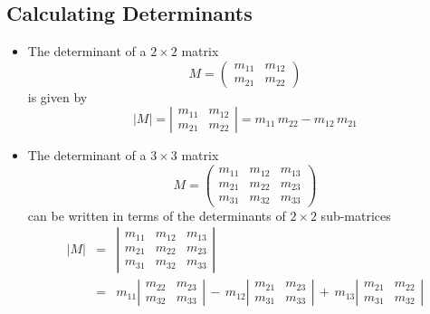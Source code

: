 \documentclass[12pt]{article}
\begin{document}
\begin{latexonly}
\subsection*{Calculating Determinants}
\end{latexonly}

\begin{itemize}
\item The determinant of a $2 \times 2$ matrix
\begin{equation}
M = 
\left(
\begin{array}{cccc}
m_{11}  & m_{12} \\
m_{21}  & m_{22} 
\end{array}
\right)
\end{equation}
is given by
\begin{equation}
|M| = 
\left|
\begin{array}{cccc}
m_{11}  & m_{12} \\
m_{21}  & m_{22} 
\end{array}
\right|
= m_{11} \, m_{22} - m_{12} \, m_{21}
\end{equation}

\item The determinant of a $3 \times 3$ matrix
\begin{equation}
M =
\left(
\begin{array}{cccc}
m_{11}  & m_{12} & m_{13} \\
m_{21}  & m_{22} & m_{23} \\
m_{31}  & m_{32} & m_{33} 
\end{array}
\right)
\end{equation}
can be written in terms of the determinants of $2 \times 2$
sub-matrices 
\begin{eqnarray}
|M| &=&
\left|
\begin{array}{cccc}
m_{11}  & m_{12} & m_{13} \\
m_{21}  & m_{22} & m_{23} \\
m_{31}  & m_{32} & m_{33} 
\end{array}
\right| \\
\nonumber
&=& m_{11} 
\left|
\begin{array}{cccc}
m_{22}  & m_{23} \\
m_{32}  & m_{33} 
\end{array}
\right| 
\,-\, m_{12} 
\left|
\begin{array}{cccc}
m_{21}  & m_{23} \\
m_{31}  & m_{33} 
\end{array}
\right| 
\,+\, m_{13} 
\left|
\begin{array}{cccc}
m_{21}  & m_{22} \\
m_{31}  & m_{32} 
\end{array}
\right|
\end{eqnarray}


\end{itemize}
\end{document}
